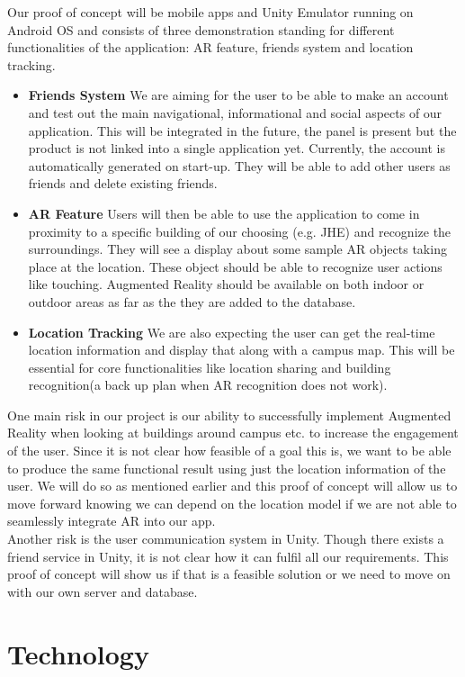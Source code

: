 \documentclass{article}
\begin{document}
Our proof of concept will be mobile apps and Unity Emulator running on Android OS and consists of three demonstration standing for different functionalities of the application: AR feature, friends system and location tracking. 
\begin{itemize}
	\item \textbf{Friends System} We are aiming for the user to be able to make an account and test out the main navigational, informational and social aspects of our application. This will be integrated in the future, the panel is present but the product is not linked into a single application yet. Currently, the account is automatically generated on start-up. They will be able to add other users as friends and delete existing friends. 
	\item \textbf{AR Feature} Users will then be able to use the application to come in proximity to a specific building of our choosing (e.g. JHE) and recognize the surroundings. They will see a display about some sample AR objects taking place at the location. These object should be able to recognize user actions like touching. Augmented Reality should be available on both indoor or outdoor areas as far as the they are added to the database.
	\item \textbf{Location Tracking} We are also expecting the user can get the real-time location information and display that along with a campus map. This will be essential for core functionalities like location sharing and building recognition(a back up plan when AR recognition does not work).
\end{itemize}
One main risk in our project is our ability to successfully implement Augmented Reality when looking at buildings around campus etc. to increase the engagement of the user. Since it is not clear how feasible of a goal this is, we want to be able to produce the same functional result using just the location information of the user. We will do so as mentioned earlier and this proof of concept will allow us to move forward knowing we can depend on the location model if we are not able to seamlessly integrate AR into our app.\\
Another risk is the user communication system in Unity. Though there exists a friend service in Unity, it is not clear how it can fulfil all our requirements. This proof of concept will show us if that is a feasible solution or we need to move on with our own server and database.

\section{Technology}
\end{document}
